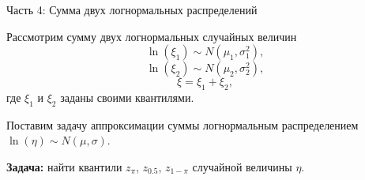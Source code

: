 \documentclass[ucs, notheorems, handout]{beamer}
\begin{document}
	
	\begin{frame}{Часть 4: Сумма двух логнормальных распределений }
		
		Рассмотрим сумму двух логнормальных случайных величин
		\begin{equation*}
			\ln(\xi_{1}) \sim N(\mu_{1}, \sigma _{1}^{2}),
		\end{equation*}
		\begin{equation*}
			\ln(\xi_{2}) \sim N(\mu_{2}, \sigma _{2}^{2}),
		\end{equation*}
		\begin{equation*}
			\xi = \xi_{1}+\xi_{2},
		\end{equation*}
		где $\xi_{1}$ и $\xi_{2}$ заданы своими квантилями.
		
		\bigskip
		
		Поставим задачу аппроксимации суммы логнормальным распределением $\ln(\eta)\sim N(\mu, \sigma)$. 
		
		\bigskip
		
		\textbf{Задача:} найти квантили $z_{\pi}$, $z_{0.5}$, $z_{1-\pi}$ случайной величины $\eta$.
		
		
		
	\end{frame}
	
\end{document}

